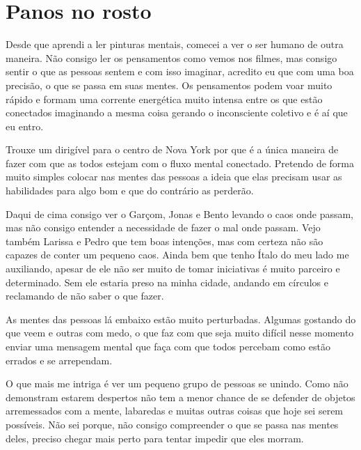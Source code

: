 
\chapter{Panos no rosto}



Desde que aprendi a ler pinturas mentais, comecei a ver o ser humano de outra maneira. Não consigo ler os pensamentos como vemos nos filmes, mas consigo sentir o que as pessoas sentem e com isso imaginar, acredito eu que com uma boa precisão, o que se passa em suas mentes. Os pensamentos podem voar muito rápido e formam uma corrente energética muito intensa entre os que estão conectados imaginando a mesma coisa gerando o inconsciente coletivo e é aí que eu entro.

Trouxe um dirigível para o centro de Nova York por que é a única maneira de fazer com que as todos estejam com o fluxo mental conectado. Pretendo de forma muito simples colocar nas mentes das pessoas a ideia que elas precisam usar as habilidades para algo bom e que do contrário as perderão.

Daqui de cima consigo ver o Garçom, Jonas e Bento levando o caos onde passam, mas não consigo entender a necessidade de fazer o mal onde passam. Vejo também Larissa e Pedro que tem boas intenções, mas com certeza não são capazes de conter um pequeno caos. Ainda bem que tenho Ítalo do meu lado me auxiliando, apesar de ele não ser muito de tomar iniciativas é muito parceiro e determinado. Sem ele estaria preso na minha cidade, andando em círculos e reclamando de não saber o que fazer.

As mentes das pessoas lá embaixo estão muito perturbadas. Algumas gostando do que veem e outras com medo, o que faz com que seja muito difícil nesse momento enviar uma mensagem mental que faça com que todos percebam como estão errados e se arrependam.

O que mais me intriga é ver um pequeno grupo de pessoas se unindo. Como não demonstram estarem despertos não tem a menor chance de se defender de objetos arremessados com a mente, labaredas e muitas outras coisas que hoje sei serem possíveis. Não sei porque, não consigo compreender o que se passa nas mentes deles, preciso chegar mais perto para tentar impedir que eles morram.


